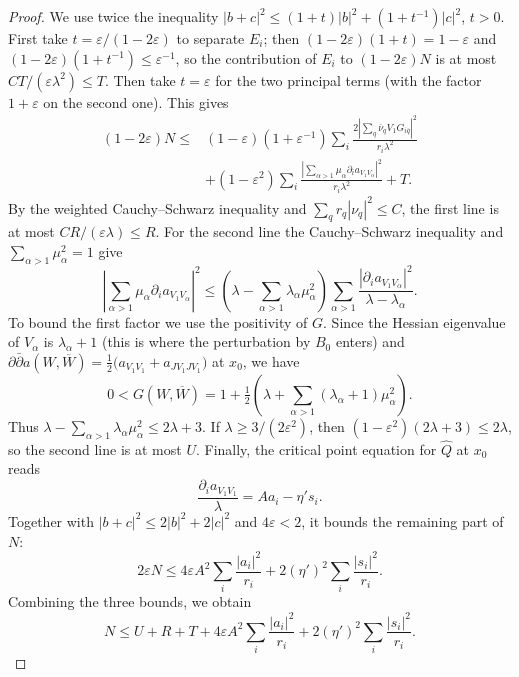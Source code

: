 \begin{proof}
We use twice the inequality $|b+c|^2\leq(1+t)|b|^2+(1+t^{-1})|c|^2$, $t>0$. First take $t=\varepsilon/(1-2\varepsilon)$ to separate $E_i$; then $(1-2\varepsilon)(1+t)=1-\varepsilon$ and $(1-2\varepsilon)(1+t^{-1})\leq\varepsilon^{-1}$, so the contribution of $E_i$ to $(1-2\varepsilon)N$ is at most $CT/(\varepsilon\lambda^2)\leq T$. Then take $t=\varepsilon$ for the two principal terms (with the factor $1+\varepsilon$ on the second one). This gives
\begin{align*}
 (1-2\varepsilon)N\leq{}&
 (1-\varepsilon)(1+\varepsilon^{-1})
     \sum_i\frac{2|\sum_q\overline\nu_q V_1G_{i\bar q}|^2}
                    {r_i\lambda^2}\\
 &+(1-\varepsilon^2)
     \sum_i\frac{|\sum_{\alpha>1}\mu_\alpha
                              \partial_i a_{V_1V_\alpha}|^2}
                       {r_i\lambda^2}+T.
\end{align*}
By the weighted Cauchy--Schwarz inequality and $\sum_qr_q|\nu_q|^2\leq C$, the first line is at most $CR/(\varepsilon\lambda)\leq R$. For the second line the Cauchy--Schwarz inequality and $\sum_{\alpha>1}\mu_\alpha^2=1$ give
\[
 \left|\sum_{\alpha>1}\mu_\alpha
                       \partial_i a_{V_1V_\alpha}\right|^2
 \leq\left(\lambda-\sum_{\alpha>1}\lambda_\alpha\mu_\alpha^2\right)
       \sum_{\alpha>1}
       \frac{|\partial_i a_{V_1V_\alpha}|^2}
                                   {\lambda-\lambda_\alpha}.
\]
To bound the first factor we use the positivity of $G$. Since the Hessian eigenvalue of $V_\alpha$ is $\lambda_\alpha+1$ (this is where the perturbation by $B_0$ enters) and $\partial\bar\partial a(W,\overline W)=\frac12\bigl(a_{V_1V_1}+a_{JV_1JV_1}\bigr)$ at $x_0$, we have
\[
 0<G(W,\overline W)
    =1+\tfrac12\left(\lambda+
               \sum_{\alpha>1}(\lambda_\alpha+1)\mu_\alpha^2\right).
\]
Thus $\lambda-\sum_{\alpha>1}\lambda_\alpha\mu_\alpha^2\leq2\lambda+3$. If $\lambda\geq3/(2\varepsilon^2)$, then $(1-\varepsilon^2)(2\lambda+3)\leq2\lambda$, so the second line is at most $U$. Finally, the critical point equation for $\widehat Q$ at $x_0$ reads
\[
 \frac{\partial_i a_{V_1V_1}}\lambda=Aa_i-\eta's_i.
\]
Together with $|b+c|^2\leq2|b|^2+2|c|^2$ and $4\varepsilon<2$, it bounds the remaining part of $N$:
\[
 2\varepsilon N\leq4\varepsilon A^2\sum_i\frac{|a_i|^2}{r_i}+2(\eta')^2\sum_i\frac{|s_i|^2}{r_i}.
\]
Combining the three bounds, we obtain
\begin{equation}\label{eq:real-hessian-third-absorption}
 N\leq U+R+T+4\varepsilon A^2\sum_i\frac{|a_i|^2}{r_i}
                           +2(\eta')^2\sum_i\frac{|s_i|^2}{r_i}.

\end{equation}
\end{proof}
